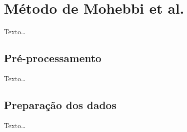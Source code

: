
\section{Método de Mohebbi et al.}
\label{sec:section3}
Texto\ldots

\subsection{Pré-processamento}
Texto\ldots

\subsection{Preparação dos dados}
Texto\ldots
